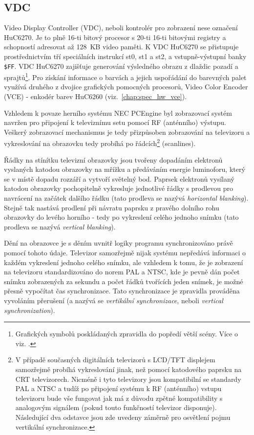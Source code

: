 %
%

\subsection{VDC}\label{chap:spec_hw_vdc}

Video Display Controller (VDC), neboli kontrolér pro zobrazení nese označení
HuC6270. Je to plně 16-ti bitový procesor s 20-ti 16-ti bitovými registry a
schopností adresovat až 128~KB video paměti. K VDC HuC6270 se přistupuje
prostřednictvím tří speciálních instrukcí {\sc st0}, {\sc st1} a {\sc st2}, a
vstupně-výstupní banky {\tt \$FF}. VDC HuC6270 zajišťuje generování výsledného
obrazu z dlaždic pozadí a sprajtů\footnote{Grafických symbolů poskládaných
zpravidla do popředí větší scény. Více o  viz.
\cite{wwwWikiSprite}.}. Pro získání informace o barvách a jejich uspořádání do
barevných palet využívá druhého z dvojice grafických pomocných procesorů, Video
Color Encoder (VCE) - enkodér barev HuC6260 (viz.~\ref{chap:spec_hw_vce}).

Vzhledem k povaze herního systému NEC PCEngine byl zobrazovací systém navržen
pro připojení k televiznímu setu pomocí RF (anténního) výstupu. Veškerý
zobrazovací mechanismus je tedy přizpůsoben zobrazování na televizoru a
vykreslování na obrazovku tedy probíhá po řádcích\footnote{V případě současných
digitálních televizorů s LCD/TFT displejem samozřejmě probíhá vykreslování
jinak, než pomocí katodového paprsku na CRT televizorech. Nicméně i tyto
televizory jsou kompatibilní se standardy PAL a NTSC a tudíž po připojení
systému k RF (anténního) vstupu televizoru bude vše fungovat jak má z důvodu
zpětné kompatibility s analogovým signálem (pokud touto funkčností televizor
disponuje). Následující dva odstavce jsou zde uvedeny záměrně pro osvětlení
pojmu vertikální synchronizace.} (scanlines).

Řádky na stínítku televizní obrazovky jsou tvořeny dopadáním elektronů
vyslaných katodou obrazovky na mřížku a předáváním energie luminoforu, který se
v místě dopadu rozzáří a vytvoří světelný bod. Paprsek elektronů vysílaný
katodou obrazovky pochopitelně vykresluje jednotlivé řádky s prodlevou pro
navrácení na začátek dalšího řádku (tato prodleva se nazývá {\em horizontal
blanking}). Stejně tak nastává prodlení při návratu paprsku z pravého dolního
rohu obrazovky do levého horního - tedy po vykreslení celého jednoho snímku
(tato prodleva se nazývá {\em vertical blanking}).~\cite{Vit02}

Dění na obrazovce je s děním uvnitř logiky programu synchronizováno právě
pomocí tohoto údaje. Televizor samozřejmě nijak systému nepředává informaci o
každém vykreslení jednoho celého snímku, ale vzhledem k tomu, že je zobrazení
na televizoru standardizováno do norem PAL a NTSC, kde je pevně dán počet
snímku zobrazených za sekundu a počet řádků tvořících jeden snímek, je možné
přesně vypočítat čas synchronizace. Tato synchronizace je zpravidla prováděna
vyvoláním přerušení (a nazývá se {\em vertikální synchronizace}, neboli {\em
vertical synchronization}).


